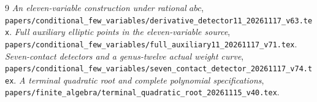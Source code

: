 \documentclass[11pt,a4paper]{article}
\begin{document}
\begin{thebibliography}{9}
\emph{An eleven-variable construction under rational $abc$},
\nolinkurl{papers/conditional_few_variables/derivative_detector11_20261117_v63.tex}.
\emph{Full auxiliary elliptic points in the eleven-variable source},
\nolinkurl{papers/conditional_few_variables/full_auxiliary11_20261117_v71.tex}.
\emph{Seven-contact detectors and a genus-twelve actual weight curve},
\nolinkurl{papers/conditional_few_variables/seven_contact_detector_20261117_v74.tex}.
\emph{A terminal quadratic root and complete polynomial specifications},
\nolinkurl{papers/finite_algebra/terminal_quadratic_root_20261115_v40.tex}.
\end{thebibliography}
\end{document}
